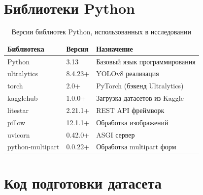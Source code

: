 \section{Библиотеки Python}

\begin{table}[H]
\centering
\caption{Версии библиотек Python, использованных в исследовании}
\label{tab:python_env}
\begin{tabular}{lll}
\toprule
\textbf{Библиотека} & \textbf{Версия} & \textbf{Назначение} \\
\midrule
Python        & 3.13    & Базовый язык программирования \\
ultralytics   & 8.4.23+ & YOLOv8 реализация \\
torch         & 2.0+    & PyTorch (бэкенд Ultralytics) \\
kagglehub     & 1.0.0+  & Загрузка датасетов из Kaggle \\
litestar      & 2.21.1+ & REST API фреймворк \\
pillow        & 12.1.1+ & Обработка изображений \\
uvicorn       & 0.42.0+ & ASGI сервер \\
python-multipart & 0.0.22+ & Обработка multipart форм \\
\bottomrule
\end{tabular}
\end{table}

\section{Код подготовки датасета}

